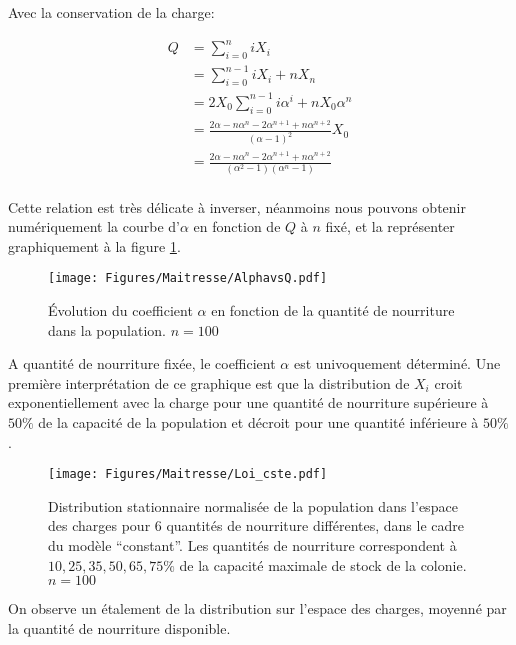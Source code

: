 Avec la conservation de la charge:

\begin{equation}
\begin{aligned}
Q	&= \sum_{i=0}^n i X_i\\
	&= \sum_{i=0}^{n-1} i X_i + n X_n\\
	&= 2 X_0 \sum_{i=0}^{n-1} i \alpha^i + n X_0 \alpha^n\\
	&= \frac{2\alpha -n\alpha^n-2\alpha^{n+1}+n\alpha^{n+2}}{(\alpha-1)^2}X_0\\
	&= \frac{2\alpha -n\alpha^n-2\alpha^{n+1}+n\alpha^{n+2}}{(\alpha^2-1)(\alpha^{n}-1)}\\
\end{aligned}
\end{equation}

Cette relation est très délicate à inverser, néanmoins nous pouvons obtenir numériquement la courbe d'$\alpha$ en fonction de $Q$ à $n$ fixé, et la représenter graphiquement à la figure \ref{AlphavsQCste}.\\

\begin{figure}[h]
\centering
\texttt{[image: Figures/Maitresse/AlphavsQ.pdf]}
\caption{Évolution du coefficient $\alpha$ en fonction de la quantité de nourriture dans la population. $n=100$}
\label{AlphavsQCste}
\end{figure}

A quantité de nourriture fixée, le coefficient $\alpha$ est univoquement déterminé. Une première interprétation de ce graphique est que la distribution de $X_i$ croit exponentiellement avec la charge pour une quantité de nourriture supérieure à $50\%$ de la capacité de la population et décroit pour une quantité inférieure à $50\%$.



\begin{figure}[h]
\centering
\texttt{[image: Figures/Maitresse/Loi\_cste.pdf]}
\caption{Distribution stationnaire normalisée de la population dans l'espace des charges pour 6 quantités de nourriture différentes, dans le cadre du modèle ``constant''. Les quantités de nourriture correspondent à $10, 25, 35, 50, 65, 75\%$ de la capacité maximale de stock de la colonie. $n=100$}
\label{DistribAnalytiqueCste}
\end{figure}

On observe un étalement de la distribution sur l'espace des charges, moyenné par la quantité de nourriture disponible.

